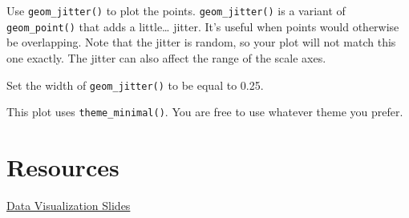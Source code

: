 \documentclass[
]{book}
\begin{document}
Use \texttt{geom\_jitter()} to plot the points. \texttt{geom\_jitter()} is a variant of \texttt{geom\_point()} that adds a little\ldots{} jitter. It's useful when points would otherwise be overlapping. Note that the jitter is random, so your plot will not match this one exactly. The jitter can also affect the range of the scale axes.

Set the width of \texttt{geom\_jitter()} to be equal to 0.25.

This plot uses \texttt{theme\_minimal()}. You are free to use whatever theme you prefer.

\hypertarget{resources-1}{%
\section{Resources}\label{resources-1}}

\href{assets/slides/03-data-visualisation-slides.pdf}{Data Visualization Slides}

  
\end{document}
